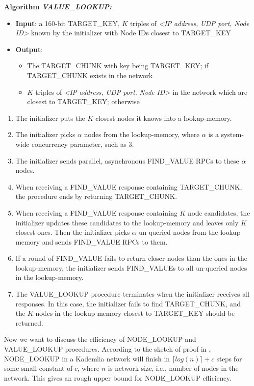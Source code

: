 \noindent \textbf{Algorithm \textit{VALUE\_LOOKUP:}}
\begin{itemize}
  \item \textbf{Input}: a 160-bit TARGET\_KEY, $K$ triples of \textit{<IP address, UDP port, Node ID>} known by the initializer with Node IDs closest to TARGET\_KEY
  \item \textbf{Output}:
  \begin{itemize}
    \item The TARGET\_CHUNK with key being TARGET\_KEY; if TARGET\_CHUNK exists in the network
    \item $K$ triples of \textit{<IP address, UDP port, Node ID>} in the network which are closest to TARGET\_KEY; otherwise
  \end{itemize}
\end{itemize}
\begin{enumerate}[label=(\roman*)]
  \item The initializer puts the $K$ closest nodes it knows into a lookup-memory.
  \item The initializer picks $\alpha$ nodes from the lookup-memory, where $\alpha$ is a system-wide concurrency parameter, such as 3.
  \item The initializer sends parallel, asynchronous FIND\_VALUE RPCs to these $\alpha$ nodes.
  \item When receiving a FIND\_VALUE response containing TARGET\_CHUNK, the procedure ends by returning TARGET\_CHUNK.
  \item When receiving a FIND\_VALUE response containing $K$ node candidates, the initializer updates these candidates to the lookup-memory and leaves only $K$ closest ones. Then the initializer picks $\alpha$ un-queried nodes from the lookup memory and sends FIND\_VALUE RPCs to them.
  \item If a round of FIND\_VALUE fails to return closer nodes than the ones in the lookup-memory, the initializer sends FIND\_VALUEs to all un-queried nodes in the lookup-memory.
  \item The VALUE\_LOOKUP procedure terminates when the initializer receives all responses. In this case, the initializer fails to find TARGET\_CHUNK, and the $K$ nodes in the lookup memory closest to TARGET\_KEY should be returned.
\end{enumerate}

Now we want to discuss the efficiency of NODE\_LOOKUP and VALUE\_LOOKUP procedures. According to the sketch of proof in \cite{maymounkov2002kademlia}, NODE\_LOOKUP in a Kademlia network will finish in $\lceil log(n) \rceil + c$ steps for some small constant of $c$, where $n$ is network size, i.e., number of nodes in the network. This gives an rough upper bound for NODE\_LOOKUP efficiency.

